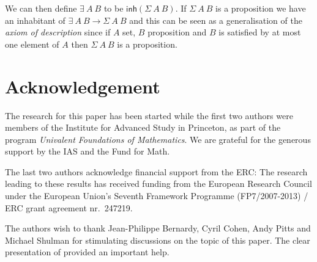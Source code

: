 \documentclass[10pt,a4paper]{article}
\newcommand{\inh}{\mathsf{inh}}
\begin{document}
 We can then define $\exists~A~B$ to be $\inh(\Sigma~A~B)$. If $\Sigma~A~B$ is a proposition we have
an inhabitant of $\exists~A~B\to \Sigma~ A~B$ and this can be seen as a generalisation of
the {\em axiom of description} since if $A$ set, $B$ proposition and $B$ is satisfied by at most
one element of $A$ then $\Sigma~A~B$ is a proposition.

\section*{Acknowledgement}
The research for this paper has been started while the first two
authors were members of the Institute for Advanced Study in Princeton,
as part of the program \emph{Univalent Foundations of Mathematics}.
We are grateful for the generous support by the IAS and the Fund for Math.

The last two authors acknowledge financial support from the ERC:  The research leading
to these results has received funding from the European Research Council under
the European Union's Seventh Framework Programme (FP7/2007-2013) / ERC
grant agreement nr.\ 247219.

 The authors wish to thank Jean-Philippe Bernardy, Cyril Cohen, Andy Pitts and Michael Shulman
for stimulating discussions on the topic of this paper. The clear presentation of \cite{Williamson}
provided an important help.
\end{document}
